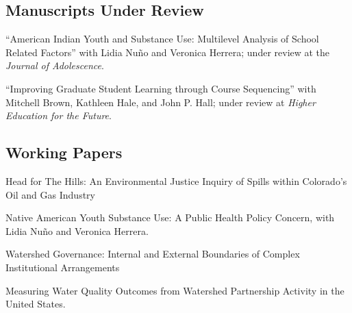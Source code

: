 \documentclass[11pt,letterpaper]{article}
\renewenvironment{itemize}{
  \begin{list}{}{
    \setlength{\leftmargin}{1.5em}
    \setlength{\itemsep}{0.25em}
    \setlength{\parskip}{0pt}
    \setlength{\parsep}{0.25em}
  }
}{
  \end{list}
}
\begin{document}
\subsection*{Manuscripts Under Review}

\begin{itemize}\leftmargin=2pt\itemindent=-15pt
	\item ``American Indian Youth and Substance Use: Multilevel Analysis of School Related Factors'' with Lidia Nu\~no and Veronica Herrera; under review at the \emph{Journal of Adolescence}.
	\item ``Improving Graduate Student Learning through Course Sequencing'' with Mitchell Brown, Kathleen Hale, and John P. Hall; under review at \emph{Higher Education for the Future}. 
\end{itemize}

\subsection*{Working Papers}

\begin{itemize}\leftmargin=2pt\itemindent=-15pt

\item Head for The Hills: An Environmental Justice Inquiry of Spills within Colorado's Oil and Gas Industry
\item Native American Youth Substance Use: A Public Health Policy Concern, with Lidia Nu\~no and Veronica Herrera.
\item Watershed Governance: Internal and External Boundaries of Complex Institutional Arrangements
\item Measuring Water Quality Outcomes from Watershed Partnership Activity in the United States.
\end{itemize}
\end{document}
